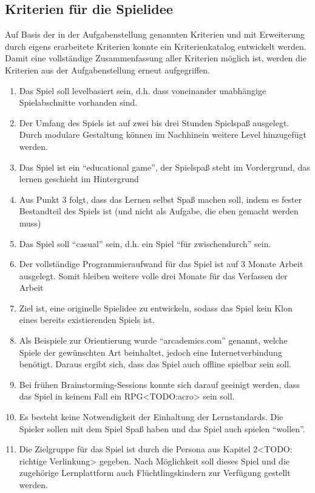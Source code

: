\subsection{Kriterien für die Spielidee}\label{ssec:kriterien}
	Auf Basis der in der Aufgabenstellung genannten Kriterien und mit Erweiterung durch eigens erarbeitete Kriterien konnte ein Kriterienkatalog entwickelt werden. Damit eine vollständige Zusammenfassung aller Kriterien möglich ist, werden die Kriterien aus der Aufgabenstellung erneut aufgegriffen.
\begin{enumerate}
	\item{Das Spiel soll levelbasiert sein, d.h. dass voneinander unabhängige Spielabschnitte vorhanden sind.}
	\item{Der Umfang des Spiels ist auf zwei bis drei Stunden Spielspaß ausgelegt. Durch modulare Gestaltung können im Nachhinein weitere Level hinzugefügt werden.}
	\item{Das Spiel ist ein \enquote{educational game}, der Spielspaß steht im Vordergrund, das lernen geschieht im Hintergrund}
	\item{Aus Punkt 3 folgt, dass das Lernen selbst Spaß machen soll, indem es fester Bestandteil des Spiels ist (und nicht als Aufgabe, die eben gemacht werden muss)}
	\item{Das Spiel soll \enquote{casual} sein, d.h. ein Spiel \enquote{für zwischendurch} sein.}
	\item{Der vollständige Programmieraufwand für das Spiel ist auf 3 Monate Arbeit ausgelegt. Somit bleiben weitere volle drei Monate für das Verfassen der Arbeit}
	\item{Ziel ist, eine originelle Spielidee zu entwickeln, sodass das Spiel kein Klon eines bereits existierenden Spiels ist.}
	\item{Als Beispiele zur Orientierung wurde \enquote{arcademics.com} genannt, welche Spiele der gewünschten Art beinhaltet, jedoch eine Internetverbindung benötigt. Daraus ergibt sich, dass das Spiel auch offline spielbar sein soll.}
	\item{Bei frühen Brainstorming-Sessions konnte sich darauf geeinigt werden, dass das Spiel in keinem Fall ein RPG<TODO:acro> sein soll.}
	\item{Es besteht keine Notwendigkeit der Einhaltung der Lernstandards. Die Spieler sollen mit dem Spiel Spaß haben und das Spiel auch spielen \enquote{wollen}.}
	\item{Die Zielgruppe für das Spiel ist durch die Persona aus Kapitel 2<TODO: richtige Verlinkung> gegeben. Nach Möglichkeit soll dieses Spiel und die zugehörige Lernplattform auch Flüchtlingskindern zur Verfügung gestellt werden.}
\end{enumerate}

